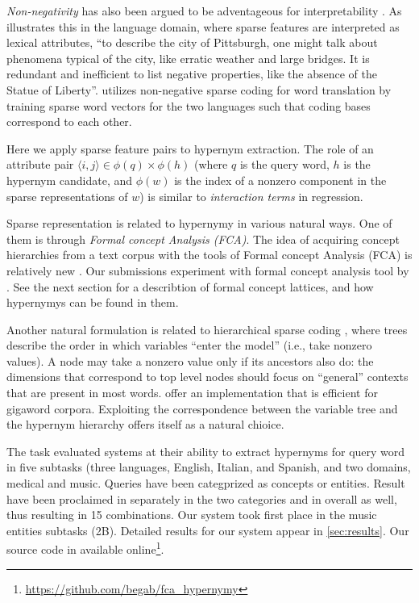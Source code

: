 \documentclass[11pt,a4paper]{article}
\begin{document}
\emph{Non-negativity} has also been argued to be adventageous for interpretability
\citep{Faruqui:2015,Fyshe:2015,Arora:2016}. As \citet{Subramanian:2018}
illustrates this in the language domain, where sparse features are interpreted
as lexical attributes, ``to describe the city of Pittsburgh, one might talk
about phenomena typical of the city, like erratic weather and large bridges. It
is redundant and inefficient to list negative properties, like the absence of
the Statue of Liberty''.
\citet{Berend:2018} utilizes non-negative sparse coding for word translation by
training sparse word vectors for the two languages such that coding bases
correspond to each other.

Here we apply sparse feature pairs to hypernym extraction. The role of an
attribute pair $\langle i,j\rangle\in\phi(q)\times\phi(h)$ (where $q$ is the query word,
$h$ is the hypernym candidate, and $\phi(w)$ is the index of a nonzero
component in the sparse representations of $w$) is similar to \emph{interaction
terms} in regression.

Sparse representation is related to hypernymy in various natural ways.  One of
them is through \emph{Formal concept Analysis (FCA)}.  The idea of acquiring concept
hierarchies from a text corpus with the tools of Formal concept Analysis (FCA)
is relatively new \citep{Cimiano:2005}.
Our submissions experiment with formal concept analysis tool by
\citet{Endres:2010}. See the next section for a describtion of formal concept
lattices, and how hypernymys can be found in them.

Another natural formulation is related to hierarchical sparse coding
\citep{Zhao:2009}, where trees describe the order in which variables “enter the
model” (i.e., take nonzero values). A node may take a nonzero value only if its
ancestors also do: the dimensions that correspond to top level nodes should
focus on “general” contexts that are present in most words.
\citet{Yogatama:2015} offer an implementation that is efficient for gigaword
corpora. Exploiting the correspondence between the variable tree and the
hypernym hierarchy offers itself as a natural chioice.

The task \citep{Camacho-Collados:2018} evaluated systems at their ability to
extract hypernyms for query word in five subtasks (three languages, English,
Italian, and Spanish, and two domains, medical and music. Queries have been
categprized as concepts or entities. Result have been proclaimed in separately
in the two categories and in overall as well, thus resulting in 15
combinations.
Our system took first place in the music entities subtasks (2B).
Detailed results for our system appear in \autoref{sec:results}.
Our source code in available online\footnote{\url{https://github.com/begab/fca_hypernymy}}.
\end{document}
